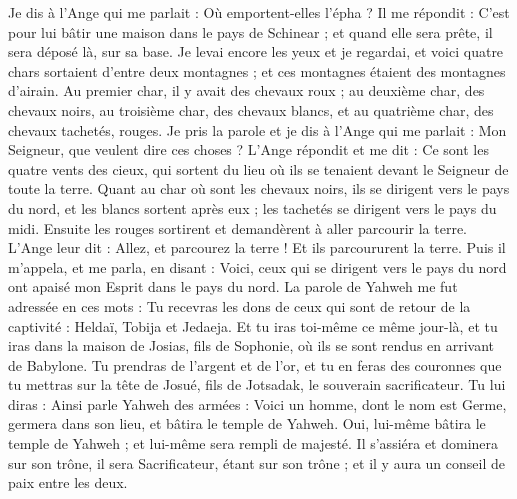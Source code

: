 \begin{multicols}{2}
Je dis à l'Ange qui me  parlait : Où emportent-elles l'épha ?
Il me répondit : C'est pour lui bâtir une maison dans le pays de Schinear ; et quand elle sera prête, il sera déposé là, sur sa base.
\VerseOne{}Je levai encore les yeux et je regardai, et voici quatre chars sortaient d'entre deux montagnes ; et ces montagnes étaient des montagnes d'airain.
Au premier char, il y avait des chevaux roux ; au deuxième char, des chevaux noirs,
au troisième char, des chevaux blancs, et au quatrième char, des chevaux tachetés, rouges.
Je pris la parole et je dis à l'Ange qui me parlait : Mon Seigneur, que veulent dire ces choses ?
L’Ange répondit et me dit : Ce sont les quatre vents des cieux, qui sortent du lieu où ils se tenaient devant le Seigneur de toute la terre.
Quant au char où sont les chevaux noirs, ils se dirigent vers le pays du nord, et les blancs sortent après eux ; les tachetés se dirigent vers le pays du midi.
Ensuite les rouges sortirent et demandèrent à aller parcourir la terre. L’Ange leur dit : Allez, et parcourez la terre ! Et ils parcoururent la terre.
Puis il m'appela, et me parla, en disant : Voici, ceux qui se dirigent vers le pays du nord ont apaisé mon Esprit dans le pays du nord.
La parole de Yahweh me fut adressée en ces mots :
Tu recevras les dons de ceux qui sont de retour de la captivité : Heldaï, Tobija et Jedaeja. Et tu iras toi-même ce même jour-là, et tu iras dans la maison de Josias, fils de Sophonie, où ils se sont rendus en arrivant de Babylone.
Tu prendras de l'argent et de l'or, et tu en feras des couronnes que tu mettras sur la tête de Josué, fils de Jotsadak, le souverain sacrificateur.
Tu lui diras : Ainsi parle Yahweh des armées : Voici un homme, dont le nom est Germe, germera dans son lieu, et bâtira le temple de Yahweh.
Oui, lui-même bâtira le temple de Yahweh ; et lui-même sera rempli de majesté. Il s’assiéra et dominera sur son trône, il sera Sacrificateur, étant sur son trône ; et il y aura un conseil de paix entre les deux.

\end{multicols}
